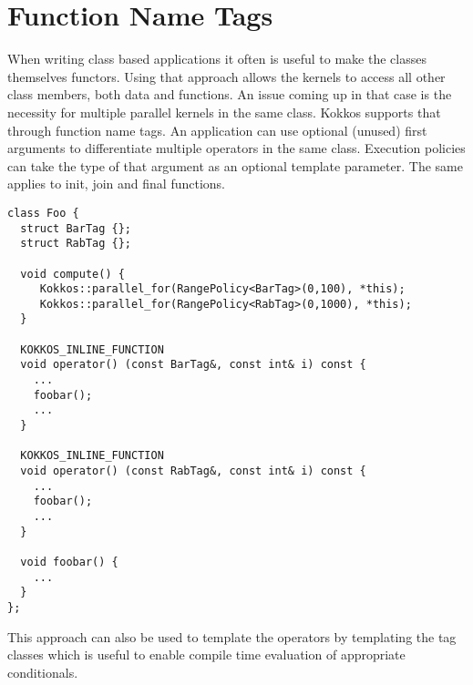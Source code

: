 \section{Function Name Tags}

When writing class based applications it often is useful to make the classes themselves functors.
Using that approach allows the kernels to access all other class members, both data and functions. 
An issue coming up in that case is the necessity for multiple parallel kernels in the same class.
Kokkos supports that through function name tags. An application can use optional (unused) first arguments
to differentiate multiple operators in the same class. Execution policies can take the type of that argument as
an optional template parameter. The same applies to init, join and final functions. 

\begin{lstlisting}
class Foo {
  struct BarTag {};
  struct RabTag {};
  
  void compute() {
     Kokkos::parallel_for(RangePolicy<BarTag>(0,100), *this);
     Kokkos::parallel_for(RangePolicy<RabTag>(0,1000), *this);
  }
  
  KOKKOS_INLINE_FUNCTION
  void operator() (const BarTag&, const int& i) const {
    ...
    foobar();
    ...
  }
  
  KOKKOS_INLINE_FUNCTION
  void operator() (const RabTag&, const int& i) const {
    ...
    foobar();
    ...
  }
  
  void foobar() {
    ...
  }
};
\end{lstlisting}

This approach can also be used to template the operators by templating the tag classes which is useful to enable compile time evaluation of appropriate conditionals. 

